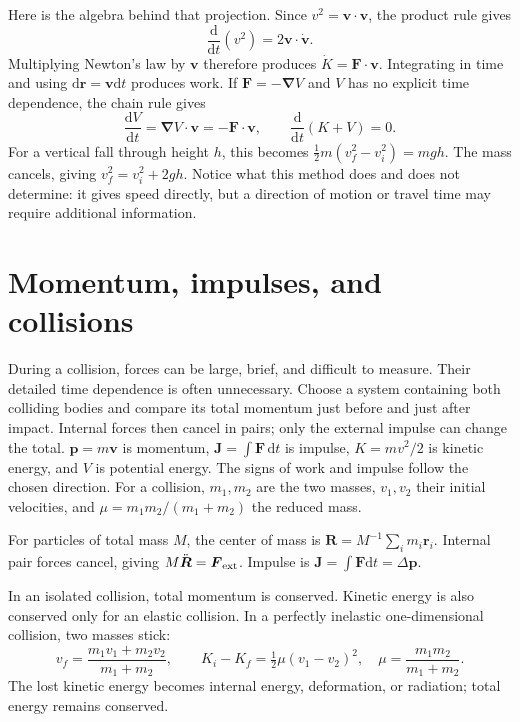 \documentclass[11pt,oneside]{book}
\newcommand{\dd}{\mathrm{d}}
\newcommand{\vect}[1]{\boldsymbol{#1}}
\newcommand{\grad}{\boldsymbol{\nabla}}
\newcommand{\od}[2]{\frac{\dd #1}{\dd #2}}
\theoremstyle{reviewstyle}
\begin{document}
Here is the algebra behind that projection. Since $v^2=\vect v\cdot\vect v$, the product rule gives
\begin{equation}
\od{}{t}(v^2)=2\vect v\cdot\dot{\vect v}.
\end{equation}
Multiplying Newton's law by $\vect v$ therefore produces $\dot K=\vect F\cdot\vect v$. Integrating in time and using $\dd\vect r=\vect v\dd t$ produces work. If $\vect F=-\grad V$ and $V$ has no explicit time dependence, the chain rule gives
\begin{equation}
\od{V}{t}=\grad V\cdot\vect v=-\vect F\cdot\vect v,
\qquad \od{}{t}(K+V)=0.
\end{equation}
For a vertical fall through height $h$, this becomes $\tfrac12m(v_f^2-v_i^2)=mgh$. The mass cancels, giving $v_f^2=v_i^2+2gh$. Notice what this method does and does not determine: it gives speed directly, but a direction of motion or travel time may require additional information.

\section{Momentum, impulses, and collisions}
During a collision, forces can be large, brief, and difficult to measure. Their detailed time dependence is often unnecessary. Choose a system containing both colliding bodies and compare its total momentum just before and just after impact. Internal forces then cancel in pairs; only the external impulse can change the total. $\vect p=m\vect v$ is momentum, $\vect J=\int\vect F\,\dd t$ is impulse, $K=mv^2/2$ is kinetic energy, and $V$ is potential energy. The signs of work and impulse follow the chosen direction. For a collision, $m_1,m_2$ are the two masses, $v_1,v_2$ their initial velocities, and $\mu=m_1m_2/(m_1+m_2)$ the reduced mass.

For particles of total mass $M$, the center of mass is $\vect R=M^{-1}\sum_i m_i\vect r_i$. Internal pair forces cancel, giving $M\ddot{\vect R}=\vect F_{\rm ext}$. Impulse is $\vect J=\int\vect F\dd t=\Delta\vect p$.

In an isolated collision, total momentum is conserved. Kinetic energy is also conserved only for an elastic collision. In a perfectly inelastic one-dimensional collision, two masses stick:
\begin{equation}
v_f=\frac{m_1v_1+m_2v_2}{m_1+m_2},\qquad
K_i-K_f=\tfrac12\mu(v_1-v_2)^2,\quad
\mu=\frac{m_1m_2}{m_1+m_2}.
\end{equation}
The lost kinetic energy becomes internal energy, deformation, or radiation; total energy remains conserved.
\end{document}
